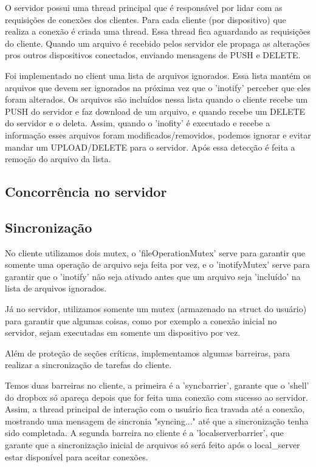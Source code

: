 \documentclass[a4paper]{article}
\begin{document}
O servidor possui uma thread principal que é responsável por lidar com as requisições de conexões dos clientes. Para cada cliente (por dispositivo) que realiza a conexão é criada uma thread. Essa thread fica aguardando as requisições do cliente. Quando um arquivo é recebido pelos servidor ele propaga as alterações pros outros dispositivos conectados, enviando mensagens de PUSH e DELETE.

Foi implementado no client uma lista de arquivos ignorados. Essa lista mantém os arquivos que devem ser ignorados na próxima vez que o 'inotify' perceber que eles foram alterados. Os arquivos são incluídos nessa lista quando o cliente recebe um PUSH do servidor e faz download de um arquivo, e quando recebe um DELETE do servidor e o deleta. Assim, quando o 'inofity' é executado e recebe a informação esses arquivos  foram modificados/removidos, podemos ignorar e evitar mandar um UPLOAD/DELETE para o servidor. Após essa detecção é feita a remoção do arquivo da lista.

\subsection{Concorrência no servidor}

\subsection{Sincronização}

No cliente utilizamos dois mutex, o 'fileOperationMutex' serve para garantir que somente uma operação de arquivo seja feita por vez, e o 'inotifyMutex' serve para garantir que o 'inotify' não seja ativado antes que um arquivo seja 'incluído' na lista de arquivos ignorados.

Já no servidor, utilizamos somente um mutex (armazenado na struct do usuário) para garantir que algumas coisas, como por exemplo a conexão inicial no servidor, sejam executadas em somente um dispositivo por vez.

Além de proteção de seções críticas, implementamos algumas barreiras, para realizar a sincronização de tarefas do cliente.

Temos duas barreiras no cliente, a primeira é a 'syncbarrier', garante que o 'shell' do dropbox só apareça depois que for feita uma conexão com sucesso ao servidor. Assim, a thread principal de interação com o usuário fica travada até a conexão, mostrando uma mensagem de sincronia "syncing..." até que a sincronização tenha sido completada.
A segunda barreira no cliente é a 'localserverbarrier', que garante que a sincronização inicial de arquivos só será feito após o local\_server estar disponível para aceitar conexões.
\end{document}
